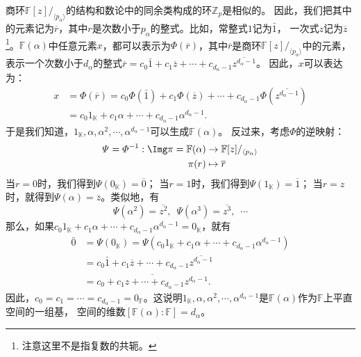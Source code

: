 \documentclass[12pt,UTF8,fontset=none]{ctexbook}
\begin{document}
\begin{appendix}
商环$\mathbb{F}[z] /_{\langle p_\alpha \rangle}$的结构和数论中的同余类构成的环$\mathbb{Z}_p$是相似的。
因此，我们把其中的元素记为$\overline{r}$，其中$r$是次数小于$p_\alpha$的整式。比如，常整式$1$记为$\bar{1}$，
一次式$z$记为$\overline{z}$\footnote{注意这里不是指复数的共轭。}。$\mathbb{F}(\alpha)$中任意元素$x$，都可以表示为$\varPhi(\overline{r})$，其中$\overline{r}$是商环$\mathbb{F}[z] /_{\langle p_\alpha \rangle}$中的元素，
表示一个次数小于$d_\alpha$的整式$\overline{r} = c_0\bar{1} + c_1\overline{z} + \cdots + c_{d_{\alpha}-1} \overline{z^{d_{\alpha}-1}}$。
因此，$x$可以表达为：
\begin{align*}
    x &= \varPhi(\overline{r}) = c_0\varPhi(\bar{1}) + c_1\varPhi(\overline{z}) + \cdots + c_{d_{\alpha}-1} \varPhi(\overline{z^{d_{\alpha}-1}})  \\
    &= c_0 1_\mathbb{K} + c_1\alpha + \cdots + c_{d_{\alpha}-1} \alpha^{d_{\alpha}-1}.
\end{align*}
于是我们知道，$1_\mathbb{K}, \alpha, \alpha^2, \cdots , \alpha^{d_{\alpha}-1}$可以生成$\mathbb{F}(\alpha)$。
反过来，考虑$\varPhi$的逆映射：
\begin{align*}
    \varPsi = \varPhi^{-1} : \Img \pi = \mathbb{F}(\alpha) &\rightarrow \mathbb{F}[z] /_{\langle p_\alpha \rangle}  \\
     \pi(r)  &\mapsto \overline{r}  
\end{align*}
当$r = 0$时，我们得到$\varPsi(0_\mathbb{K}) = \overline{0}$；
当$r = 1$时，我们得到$\varPsi(1_\mathbb{K}) = \overline{1}$；
当$r = z$时，就得到$\varPsi(\alpha) = \overline{z}$。类似地，有
$$ \varPsi(\alpha^2) = \overline{z^2} , \,\,\, \varPsi(\alpha^3) = \overline{z^3} , \,\,\, \cdots $$
那么，如果$c_0 1_\mathbb{K} + c_1\alpha + \cdots + c_{d_{\alpha}-1} \alpha^{d_{\alpha}-1} = 0_\mathbb{K}$，就有
\begin{align*}
    \bar{0} &= \varPsi(0_\mathbb{K}) = \varPsi\left(c_0 1_\mathbb{K} + c_1\alpha + \cdots + c_{d_{\alpha}-1} \alpha^{d_{\alpha}-1}\right)  \\
    &= c_0\bar{1} + c_1\overline{z} + \cdots + c_{d_{\alpha}-1} \overline{z^{d_{\alpha}-1}}  \\
    &= \overline{c_0 + c_1z + \cdots + c_{d_{\alpha}-1} z^{d_{\alpha}-1}}. 
\end{align*}
因此，$c_0 = c_1 = \cdots = c_{d_{\alpha}-1} = 0_\mathbb{F}$。这说明$1_\mathbb{K}, \alpha, \alpha^2, \cdots , \alpha^{d_{\alpha}-1}$是$\mathbb{F}(\alpha)$作为$\mathbb{F}$上平直空间的一组基，
空间的维数$[\mathbb{F}(\alpha) : \mathbb{F}] = d_{\alpha}$。


\end{appendix}
\end{document}
